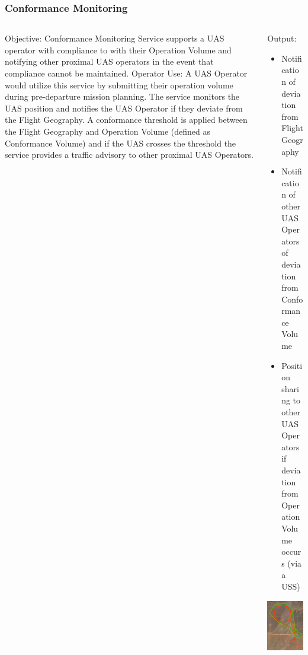 \documentclass[usenames,dvipsnames,aspectratio=169,serif]{beamer}
\begin{document}
\begin{frame}
   \frametitle{Conformance Monitoring}
   \begin{columns}[t]
      \begin{column}{0.5\textwidth}
         Objective: Conformance Monitoring Service supports a UAS operator with compliance to with their Operation Volume and notifying other proximal UAS operators in the event that compliance cannot be maintained.
         Operator Use: A UAS Operator would utilize this service by submitting their operation volume during pre-departure mission planning. The service monitors the UAS position and notifies the UAS Operator if they deviate from the Flight Geography. A conformance threshold is applied between the Flight Geography and Operation Volume (defined as Conformance Volume) and if the UAS crosses the threshold the service provides a traffic advisory to other proximal UAS Operators.
      \end{column}
      \begin{column}{0.5\textwidth}
         Output:
         \begin{itemize}
         \item  Notification of deviation from Flight Geography
         \item  Notification of other UAS Operators of deviation from Conformance Volume
         \item  Position sharing to other UAS Operators if deviation from Operation Volume occurs (via a USS)
         \end{itemize}
         \includegraphics[height=0.45\textwidth]{img/conformance-monitoring.png}

      \end{column}
   \end{columns}
\end{frame}
\end{document}
